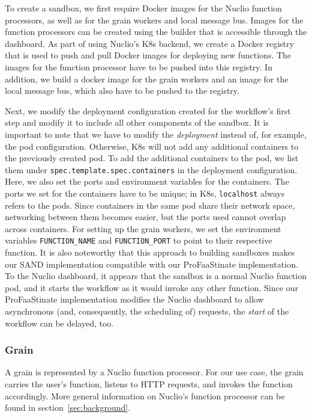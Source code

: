 To create a sandbox, we first require Docker images for the Nuclio function processors, as well as for the grain workers and local message bus.
Images for the function processors can be created using the builder that is accessible through the dashboard. 
As part of using Nuclio's K8s backend, we create a Docker registry that is used to push and pull Docker images for deploying new functions.
The images for the function processor have to be pushed into this registry.
In addition, we build a docker image for the grain workers and an image for the local message bus, which also have to be pushed to the registry.

Next, we modify the deployment configuration created for the workflow's first step and modify it to include all other components of the sandbox.
It is important to note that we have to modify the \emph{deployment} instead of, for example, the pod configuration. 
Otherwise, K8s will not add any additional containers to the previously created pod.
To add the additional containers to the pod, we list them under \texttt{spec.template.spec.containers} in the deployment configuration.
Here, we also set the ports and environment variables for the containers. 
The ports we set for the containers have to be unique; in K8s, \texttt{localhost} always refers to the pods.
Since containers in the same pod share their network space, networking between them becomes easier, but the ports used cannot overlap across containers.
For setting up the grain workers, we set the environment variables \texttt{FUNCTION\_NAME} and \texttt{FUNCTION\_PORT} to point to their respective function. 
It is also noteworthy that this approach to building sandboxes makes our SAND implementation compatible with our ProFaaStinate implementation.
To the Nuclio dashboard, it appears that the sandbox is a normal Nuclio function pod, and it starts the workflow as it would invoke any other function. 
Since our ProFaaStinate implementation modifies the Nuclio dashboard to allow asynchronous (and, consequently, the scheduling of) requests, the \emph{start} of the workflow can be delayed, too.

\subsubsection{Grain}

A grain is represented by a Nuclio function processor. 
For our use case, the grain carries the user's function, listens to HTTP requests, and invokes the function accordingly.
More general information on Nuclio's function processor can be found in section~\ref{sec:background}. %

